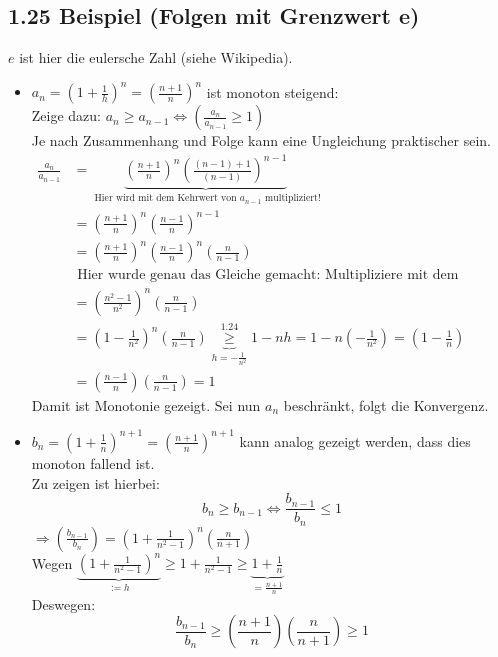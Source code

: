 \documentclass[12pt]{article}
\begin{document}
\subsection*{1.25 Beispiel (Folgen mit Grenzwert e)}
$ e$ ist hier die eulersche Zahl (siehe Wikipedia).\\
\begin{itemize}
	\item $a_n = (1 + \frac{1}{h})^n = (\frac{n +1}{n})^n$ ist monoton steigend:\\
		Zeige dazu: $a_n \geq a_{n-1} \Leftrightarrow (\frac{a_n}{a_{n-1}} \geq 1)$\\
		Je nach Zusammenhang und Folge kann eine Ungleichung praktischer sein. \\
		\begin{align*}
		\frac{a_n}{a_{n-1}} &= \underbrace{ (\frac{n +1}{n})^n (\frac{(n-1) +1 }{(n-1)})^{n-1} }_{\text{ Hier wird mit dem Kehrwert von $a_{n-1}$ multipliziert!}}\\
		&= (\frac{n +1}{n})^n (\frac{n -1}{n})^{n-1}\\
		&= (\frac{n +1}{n})^n (\frac{n -1}{n})^n (\frac{n}{n-1})\\
		&\text{ Hier wurde genau das Gleiche gemacht: Multipliziere mit dem Kehrbruch}\\
		&= (\frac{n^2 -1}{n^2})^n (\frac{n}{n-1})\\
		&= (1- \frac{1}{n^2})^n (\frac{n}{n-1}) \underbrace{ \geq } _{h=-\frac{1}{n^2}} ^{1.24} 1-nh = 1-n(-\frac{1}{n^2}) = (1- \frac{1}{n})\\
		&= (\frac{n-1}{n}) (\frac{n}{n-1}) = 1
		\end{align*}
		Damit ist Monotonie gezeigt. Sei nun $a_n$ beschränkt, folgt die Konvergenz. \\
	
	\item $b_n = (1+ \frac{1}{n})^{n+1} = (\frac{n+1}{n})^{n+1}$ kann analog gezeigt werden, dass dies monoton fallend ist. \\
	Zu zeigen ist hierbei:
	$$ b_n \geq b_{n-1} \Leftrightarrow \frac{b_{n-1}}{b_n} \leq 1$$
	$\Rightarrow  (\frac{b_{n-1}}{b_n}) = (1 + \frac{1}{n^2 -1})^n (\frac{n}{n+1})$\\
	Wegen $\underbrace{(1 + \frac{1}{n^2 -1})^n}_{:=h} \geq 1 + \frac{1}{n^2 -1} \geq \underbrace{ 1 + \frac{1}{n}}_{=\frac{n+1}{n}}$\\
	Deswegen:
	$$ \frac{b_{n-1}}{b_n} \geq (\frac{n+1}{n})(\frac{n}{n+1}) \geq 1$$ 
\end{itemize}
\end{document}
